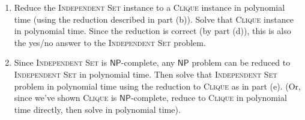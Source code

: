 \documentclass[12 pt, letterpaper]{hmcpset}
\begin{document}
\begin{solution}
\begin{enumerate}
		\item Reduce the \textsc{Independent Set} instance to a \textsc{Clique} instance in polynomial time (using the reduction described in part (b)). Solve that \textsc{Clique} instance in polynomial time. Since the reduction is correct (by part (d)), this is also the yes/no answer to the \textsc{Independent Set} problem.

		\item Since \textsc{Independent Set} is $\mathsf{NP}$-complete, any $\mathsf{NP}$ problem can be reduced to \textsc{Independent Set} in polynomial time. Then solve that \textsc{Independent Set} problem in polynomial time using the reduction to \textsc{Clique} as in part (e). (Or, since we've shown \textsc{Clique} is $\mathsf{NP}$-complete, reduce to \textsc{Clique} in polynomial time directly, then solve in polynomial time).
	\end{enumerate}
\end{solution}

\pagebreak
\end{document}
